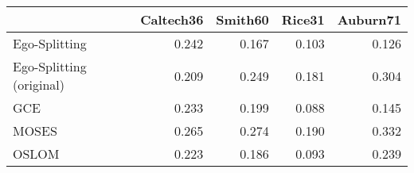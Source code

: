 \begin{tabular}{lrrrr}
\toprule
{} & Caltech36 & Smith60 & Rice31 & Auburn71 \\
\midrule
Ego-Splitting            &     0.242 &   0.167 &  0.103 &    0.126 \\
Ego-Splitting (original) &     0.209 &   0.249 &  0.181 &    0.304 \\
GCE                      &     0.233 &   0.199 &  0.088 &    0.145 \\
MOSES                    &     0.265 &   0.274 &  0.190 &    0.332 \\
OSLOM                    &     0.223 &   0.186 &  0.093 &    0.239 \\
\bottomrule
\end{tabular}
